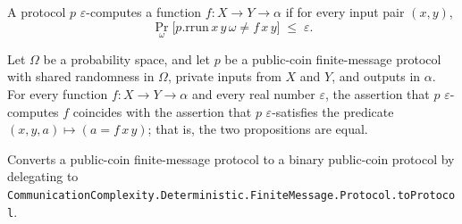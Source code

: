 \begin{definition}
\label{CommunicationComplexity.PublicCoin.FiniteMessage.Protocol.ApproxComputes}
\leanok
{}
A protocol $p$ $\varepsilon$-computes a function $f : X \to Y \to \alpha$ if for every
input pair $(x, y)$,
\[
  \Pr_{\omega}\bigl[p.\mathrm{rrun}\,x\,y\,\omega \ne f\,x\,y\bigr] \;\le\; \varepsilon.
\]
\end{definition}

\begin{theorem}
\label{CommunicationComplexity.PublicCoin.FiniteMessage.Protocol.ApproxComputes_eq_ApproxSatisfies}
\leanok
{}
Let $\Omega$ be a probability space, and let $p$ be a public-coin finite-message
protocol with shared randomness in $\Omega$, private inputs from $X$ and $Y$, and
outputs in $\alpha$. For every function $f : X \to Y \to \alpha$ and every real number
$\varepsilon$, the assertion that $p$ $\varepsilon$-computes $f$ coincides with the
assertion that $p$ $\varepsilon$-satisfies the predicate $(x, y, a) \mapsto (a =
f\,x\,y)$; that is, the two propositions are equal.
\end{theorem}

\begin{definition}
\label{CommunicationComplexity.PublicCoin.FiniteMessage.Protocol.toProtocol}
\leanok
{}
Converts a public-coin finite-message protocol to a binary public-coin protocol by
delegating to \texttt{CommunicationComplexity.Deterministic.FiniteMessage.Protocol.toProtocol}.
\end{definition}

